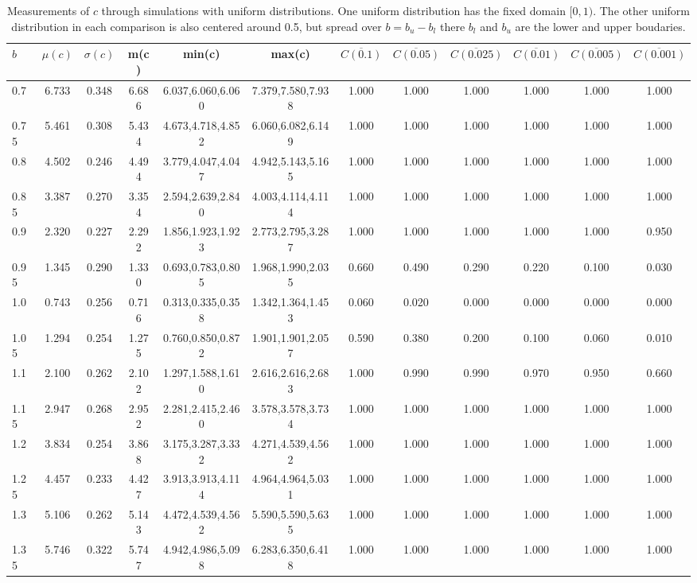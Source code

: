 \begin{table*}[h!]
\begin{center}
\begin{tabular}{| l | c | c | c | c | c | c | c | c | c | c | c |}\hline
$b$ & $\mu(c)$ & $\sigma(c)$ & m(c) & min(c) & max(c) & $\overline{C(0.1)}$ & $\overline{C(0.05)}$ & $\overline{C(0.025)}$ & $\overline{C(0.01)}$ & $\overline{C(0.005)}$ & $\overline{C(0.001)}$ \\\hline
0.7 & 6.733 & 0.348 & 6.686 & 6.037,6.060,6.060 & 7.379,7.580,7.938  & 1.000  & 1.000  & 1.000  & 1.000  & 1.000  & 1.000 \\\hline
0.75 & 5.461 & 0.308 & 5.434 & 4.673,4.718,4.852 & 6.060,6.082,6.149  & 1.000  & 1.000  & 1.000  & 1.000  & 1.000  & 1.000 \\\hline
0.8 & 4.502 & 0.246 & 4.494 & 3.779,4.047,4.047 & 4.942,5.143,5.165  & 1.000  & 1.000  & 1.000  & 1.000  & 1.000  & 1.000 \\\hline
0.85 & 3.387 & 0.270 & 3.354 & 2.594,2.639,2.840 & 4.003,4.114,4.114  & 1.000  & 1.000  & 1.000  & 1.000  & 1.000  & 1.000 \\\hline
0.9 & 2.320 & 0.227 & 2.292 & 1.856,1.923,1.923 & 2.773,2.795,3.287  & 1.000  & 1.000  & 1.000  & 1.000  & 1.000  & 0.950 \\\hline
0.95 & 1.345 & 0.290 & 1.330 & 0.693,0.783,0.805 & 1.968,1.990,2.035  & 0.660  & 0.490  & 0.290  & 0.220  & 0.100  & 0.030 \\\hline
1.0 & 0.743 & 0.256 & 0.716 & 0.313,0.335,0.358 & 1.342,1.364,1.453  & 0.060  & 0.020  & 0.000  & 0.000  & 0.000  & 0.000 \\\hline
1.05 & 1.294 & 0.254 & 1.275 & 0.760,0.850,0.872 & 1.901,1.901,2.057  & 0.590  & 0.380  & 0.200  & 0.100  & 0.060  & 0.010 \\\hline
1.1 & 2.100 & 0.262 & 2.102 & 1.297,1.588,1.610 & 2.616,2.616,2.683  & 1.000  & 0.990  & 0.990  & 0.970  & 0.950  & 0.660 \\\hline
1.15 & 2.947 & 0.268 & 2.952 & 2.281,2.415,2.460 & 3.578,3.578,3.734  & 1.000  & 1.000  & 1.000  & 1.000  & 1.000  & 1.000 \\\hline
1.2 & 3.834 & 0.254 & 3.868 & 3.175,3.287,3.332 & 4.271,4.539,4.562  & 1.000  & 1.000  & 1.000  & 1.000  & 1.000  & 1.000 \\\hline
1.25 & 4.457 & 0.233 & 4.427 & 3.913,3.913,4.114 & 4.964,4.964,5.031  & 1.000  & 1.000  & 1.000  & 1.000  & 1.000  & 1.000 \\\hline
1.3 & 5.106 & 0.262 & 5.143 & 4.472,4.539,4.562 & 5.590,5.590,5.635  & 1.000  & 1.000  & 1.000  & 1.000  & 1.000  & 1.000 \\\hline
1.35 & 5.746 & 0.322 & 5.747 & 4.942,4.986,5.098 & 6.283,6.350,6.418  & 1.000  & 1.000  & 1.000  & 1.000  & 1.000  & 1.000 \\\hline
\end{tabular}
\caption{Measurements of $c$ through simulations
with uniform distributions.
One uniform distribution has the fixed domain $[0,1)$.
The other uniform distribution in each comparison
is also centered around 0.5,
but spread over $b=b_u-b_l$ there $b_l$ and $b_u$ are the lower and upper boudaries.}
\end{center}
\end{table*}